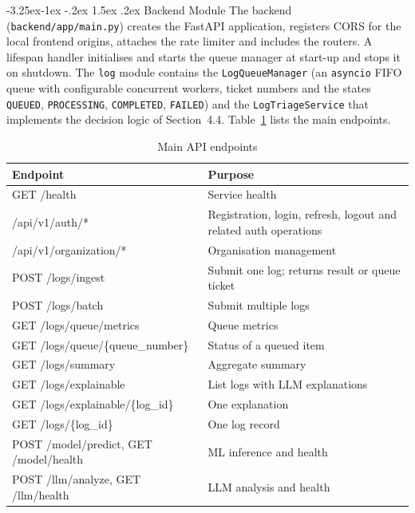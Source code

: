 \documentclass[12pt,a4paper]{report}
\makeatletter
\renewcommand{\arraystretch}{1.05}
\renewcommand\subsection{\@startsection{subsection}{2}{\z@}%
  {-3.25ex\@plus -1ex \@minus -.2ex}%
  {1.5ex \@plus .2ex}%
  {\normalfont\fontsize{12}{18}\selectfont\bfseries}}
\makeatother
\begin{document}
\subsection{Backend Module}
The backend (\texttt{backend/app/main.py}) creates the FastAPI application, registers CORS for the local frontend origins, attaches the rate limiter and includes the routers. A lifespan handler initialises and starts the queue manager at start-up and stops it on shutdown. The \texttt{log} module contains the \texttt{LogQueueManager} (an \texttt{asyncio} FIFO queue with configurable concurrent workers, ticket numbers and the states \texttt{QUEUED}, \texttt{PROCESSING}, \texttt{COMPLETED}, \texttt{FAILED}) and the \texttt{LogTriageService} that implements the decision logic of Section~4.4. Table~\ref{tab:endpoints} lists the main endpoints.

\begin{table}[htbp]
\centering
\caption{Main API endpoints}
\label{tab:endpoints}
\small
\renewcommand{\arraystretch}{1.15}
\begin{tabularx}{\textwidth}{>{\ttfamily\raggedright\arraybackslash}p{5.3cm} >{\raggedright\arraybackslash}X}
\toprule
\textbf{Endpoint} & \textbf{Purpose}\\
\midrule
GET /health & Service health\\
/api/v1/auth/* & Registration, login, refresh, logout and related auth operations\\
/api/v1/organization/* & Organisation management\\
POST /logs/ingest & Submit one log; returns result or queue ticket\\
POST /logs/batch & Submit multiple logs\\
GET /logs/queue/metrics & Queue metrics\\
GET /logs/queue/\{queue\_number\} & Status of a queued item\\
GET /logs/summary & Aggregate summary\\
GET /logs/explainable & List logs with LLM explanations\\
GET /logs/explainable/\{log\_id\} & One explanation\\
GET /logs/\{log\_id\} & One log record\\
POST /model/predict, GET /model/health & ML inference and health\\
POST /llm/analyze, GET /llm/health & LLM analysis and health\\
\bottomrule
\end{tabularx}
\end{table}
\end{document}
